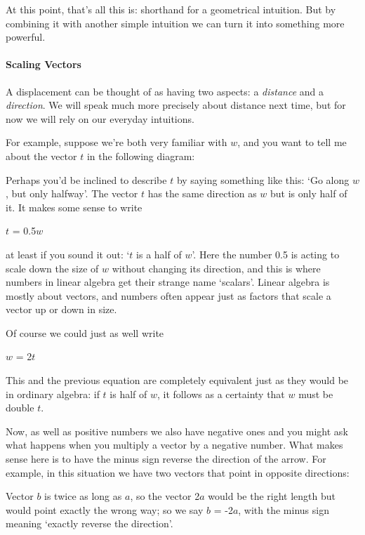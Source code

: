 \documentclass[oneside,english]{amsbook}
\numberwithin{section}{chapter}
\theoremstyle{plain}
\theoremstyle{definition}
\begin{document}
At this point, that's all this is: shorthand for a geometrical
intuition. But by combining it with another simple intuition we can turn
it into something more powerful.

\paragraph{Scaling Vectors}

A displacement can be thought of as having two aspects: a
\emph{distance} and a \emph{direction}. We will speak much more
precisely about distance next time, but for now we will rely on our
everyday intuitions.

For example, suppose we're both very familiar with $w$, and you want
to tell me about the vector $t$ in the following diagram:


Perhaps you'd be inclined to describe $t$ by saying something like
this: `Go along $w$, but only halfway'. The vector $t$ has the
same direction as $w$ but is only half of it. It makes some sense to
write

$t$ = 0.5$w$

at least if you sound it out: `$t$ is a half of $w$'. Here the
number 0.5 is acting to scale down the size of $w$ without changing
its direction, and this is where numbers in linear algebra get their
strange name `scalars'. Linear algebra is mostly about vectors, and
numbers often appear just as factors that scale a vector up or down in
size.

Of course we could just as well write

$w$ = 2$t$

This and the previous equation are completely equivalent just as they
would be in ordinary algebra: if $t$ is half of $w$, it follows as
a certainty that $w$ must be double $t$.

Now, as well as positive numbers we also have negative ones and you
might ask what happens when you multiply a vector by a negative number.
What makes sense here is to have the minus sign reverse the direction of
the arrow. For example, in this situation we have two vectors that point
in opposite directions:


Vector $b$ is twice as long as $a$, so the vector 2$a$ would be
the right length but would point exactly the wrong way; so we say $b$
= -2$a$, with the minus sign meaning `exactly reverse the
direction'.
\end{document}
